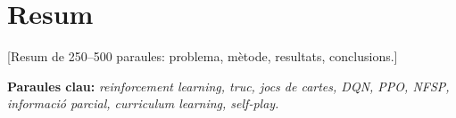 
\chapter*{Resum}

[Resum de 250--500 paraules: problema, mètode, resultats, conclusions.]

\bigskip
\noindent\textbf{Paraules clau:} \emph{reinforcement learning, truc, jocs de cartes, DQN, PPO, NFSP, informació parcial, curriculum learning, self-play.}
